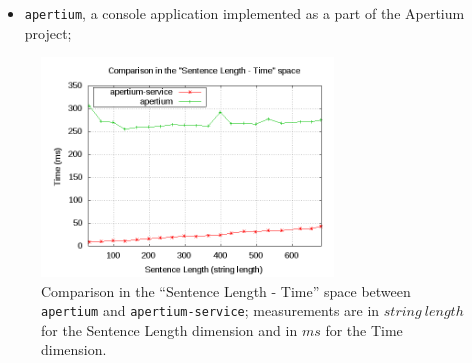 \documentclass[11pt]{article}
\begin{document}
\begin{itemize}
 \item {\tt apertium}, a console application implemented as a part of the Apertium project;
\end{itemize}

%
%
\begin{figure}[!ht]
\begin{center}
\includegraphics[width=7.75cm]{compap}
\end{center}
\caption{Comparison in the ``Sentence Length - Time'' space between {\tt apertium} and {\tt apertium-service}; measurements are in $string\ length$ for the Sentence Length dimension and in $ms$ for the Time dimension.}
\label{fig:compap}
\end{figure}
\end{document}
